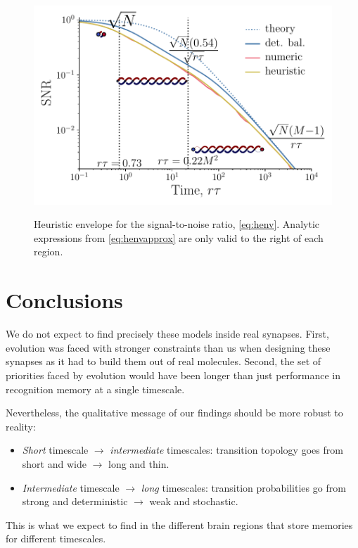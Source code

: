 \documentclass[12pt]{article}
\begin{document}
\begin{figure}[tb]
  \centering
  \includegraphics[width=0.8\linewidth]{LenvHeuristic.pdf}\\
  \caption[Heuristic envelope for the signal-to-noise ratio]
  {Heuristic envelope  for the signal-to-noise ratio, \cref{eq:henv}.
  Analytic expressions from \cref{eq:henvapprox} are only valid to the right of each region.}\label{fig:heuristicenv}
\end{figure}


\section{Conclusions}\label{sec:conclusions}


We do not expect to find precisely these models inside real synapses.
First, evolution was faced with stronger constraints than us when designing these synapses as it had to build them out of real molecules.
Second, the set of priorities faced by evolution would have been longer than just performance in recognition memory at a single timescale.

Nevertheless, the qualitative message of our findings should be more robust to reality:
%
\begin{itemize}
  \item \emph{Short} timescale \(\to\) \emph{intermediate} timescales: transition topology goes from \\ short and wide \(\to\) long and thin.
  \item \emph{Intermediate} timescale \(\to\) \emph{long} timescales: transition probabilities go from \\ strong and deterministic \(\to\) weak and stochastic.
\end{itemize}
%
This is what we expect to find in the different brain regions that store memories for different timescales.
\end{document}

